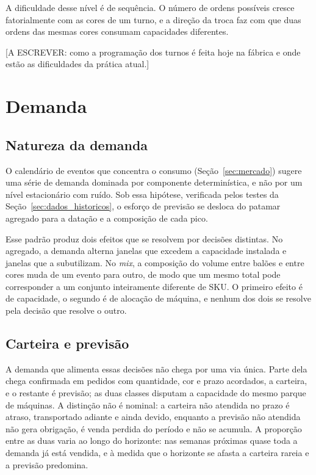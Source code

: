 \documentclass[
    12pt,
    openright,
    oneside,
    a4paper,
    fleqn,
    chapter=TITLE,
    section=TITLE,
    english,
    brazil
]{abntex2}
\begin{document}
A dificuldade desse nível é de sequência. O número de ordens possíveis cresce fatorialmente com as cores de um turno, e a direção da troca faz com que duas ordens das mesmas cores consumam capacidades diferentes.

[A ESCREVER: como a programação dos turnos é feita hoje na fábrica e onde estão as dificuldades da prática atual.]


\chapter{Demanda}
\label{sec:modelo_demanda}

\section{Natureza da demanda}
\label{sec:natureza_demanda}

O calendário de eventos que concentra o consumo (Seção~\ref{sec:mercado}) sugere uma série de demanda dominada por componente determinística, e não por um nível estacionário com ruído. Sob essa hipótese, verificada pelos testes da Seção~\ref{sec:dados_historicos}, o esforço de previsão se desloca do patamar agregado para a datação e a composição de cada pico.

Esse padrão produz dois efeitos que se resolvem por decisões distintas. No agregado, a demanda alterna janelas que excedem a capacidade instalada e janelas que a subutilizam. No \textit{mix}, a composição do volume entre balões e entre cores muda de um evento para outro, de modo que um mesmo total pode corresponder a um conjunto inteiramente diferente de SKU. O primeiro efeito é de capacidade, o segundo é de alocação de máquina, e nenhum dos dois se resolve pela decisão que resolve o outro.

\section{Carteira e previsão}
\label{sec:carteira_previsao}

A demanda que alimenta essas decisões não chega por uma via única. Parte dela chega confirmada em pedidos com quantidade, cor e prazo acordados, a carteira, e o restante é previsão; as duas classes disputam a capacidade do mesmo parque de máquinas. A distinção não é nominal: a carteira não atendida no prazo é atraso, transportado adiante e ainda devido, enquanto a previsão não atendida não gera obrigação, é venda perdida do período e não se acumula. A proporção entre as duas varia ao longo do horizonte: nas semanas próximas quase toda a demanda já está vendida, e à medida que o horizonte se afasta a carteira rareia e a previsão predomina.
\end{document}
